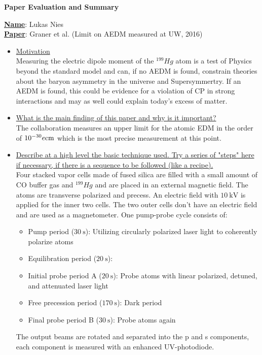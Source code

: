 \documentclass[12pt]{article}
\begin{document}
\noindent
\begin{center}
	\centering
	\Large{\textbf{Paper Evaluation and Summary}}
\end{center}
\textbf{\underline{Name}}: Lukas Nies \\
\noindent
\textbf{\underline{Paper}}: Graner et al. (Limit on AEDM measured at UW, 2016) \\[0.5cm] 
\noindent
\begin{itemize}
	\item \ul{Motivation} \\
	\noindent
	Measuring the electric dipole moment of the $^{199}Hg$ atom is a test of Physics beyond the standard model and can, if no AEDM is found, constrain theories about the baryon asymmetry in the universe and Supersymmertry. If an AEDM is found, this could be evidence for a violation of CP in strong interactions and may as well could explain today's excess of matter.
	\item \ul{What is the main finding of this paper and why is it important?} \\
	\noindent
	The collaboration measures an upper limit for the atomic EDM in the order of $\si{10\tothe{-30}\elementarycharge\centi\meter}$ which is the most precise measurement at this point.

	\item \ul{Describe at a high level the basic technique used. Try a series of "steps" here if necessary, if there is a sequence to be followed (like a recipe).} \\
	\noindent
	Four stacked vapor cells made of fused silica are filled with a small amount of CO buffer gas and $^{199}Hg$ and are placed in an external magnetic field. The atoms are transverse polarized and precess. An electric field with $\SI{10}{\kilo\volt}$ is applied for the inner two cells. The two outer cells don't have an electric field and are used as a magnetometer. One pump-probe cycle consists of:
	\begin{itemize}
		\item Pump period ($\SI{30}{\second}$): Utilizing circularly polarized laser light to coherently polarize atoms 
		\item Equilibration period ($\SI{20}{\second}$): 
		\item Initial probe period A ($\SI{20}{\second}$): Probe atoms with linear polarized, detuned, and attenuated laser light 
		\item Free precession period ($\SI{170}{\second}$): Dark period
		\item Final probe period B ($\SI{30}{\second}$): Probe atoms again
	\end{itemize} 
	The output beams are rotated and separated into the p and s components, each component is measured with an enhanced UV-photodiode.    
	

\end{itemize}
\end{document}
